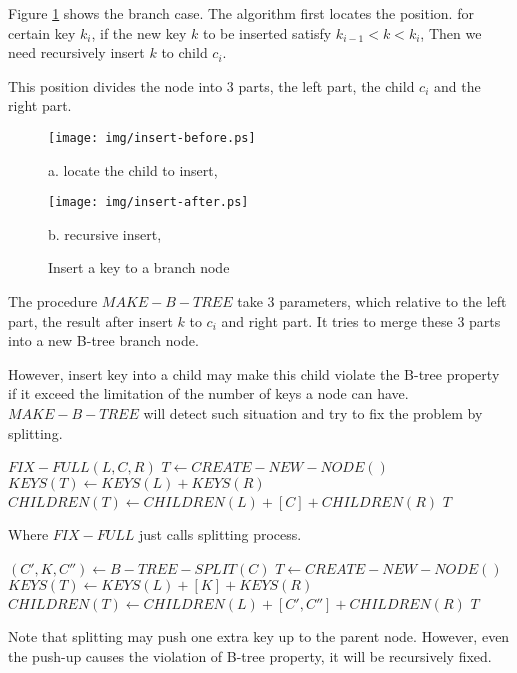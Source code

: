\documentclass{article}
\begin{document}
Figure \ref{fig:recursive-insert} shows the branch case. The
algorithm first locates the position. for certain key $k_i$,
if the new key $k$ to be inserted satisfy $k_{i-1}<k<k_i$,
Then we need recursively insert $k$ to child $c_i$.

This position divides the node into 3 parts, the left part,
the child $c_i$ and the right part.

\begin{figure}[htbp]
       \begin{center}
       	  \texttt{[image: img/insert-before.ps]}

          a. locate the child to insert,

          \texttt{[image: img/insert-after.ps]}

          b. recursive insert, 
        \caption{Insert a key to a branch node} \label{fig:recursive-insert}
       \end{center}
\end{figure}

The procedure $MAKE-B-TREE$ take 3 parameters, which relative to
the left part, the result after insert $k$ to $c_i$ and right part. 
It tries to merge these 3 parts into a new B-tree branch node.

However, insert key into a child may make this child violate the
B-tree property if it exceed the limitation of the number of keys
a node can have. $MAKE-B-TREE$ will detect such situation and try
to fix the problem by splitting.

\begin{algorithmic}[1]
    \State \Return $FIX-FULL(L, C, R)$
  \Else
    \State $T \leftarrow CREATE-NEW-NODE()$
    \State $KEYS(T) \leftarrow KEYS(L) + KEYS(R)$
    \State $CHILDREN(T) \leftarrow CHILDREN(L)+[C]+CHILDREN(R)$
    \State \Return $T$
  \EndIf
\EndFunction
\end{algorithmic}

Where $FIX-FULL$ just calls splitting process.

\begin{algorithmic}[1]
  \State $(C', K, C'') \leftarrow B-TREE-SPLIT(C)$
  \State $T \leftarrow CREATE-NEW-NODE()$
  \State $KEYS(T) \leftarrow KEYS(L)+[K]+KEYS(R)$
  \State $CHILDREN(T) \leftarrow CHILDREN(L)+[C', C'']+CHILDREN(R)$
  \State \Return $T$
\EndFunction
\end{algorithmic}

Note that splitting may push one extra key up to the parent node.
However, even the push-up causes the violation of B-tree property,
it will be recursively fixed.
\end{document}
